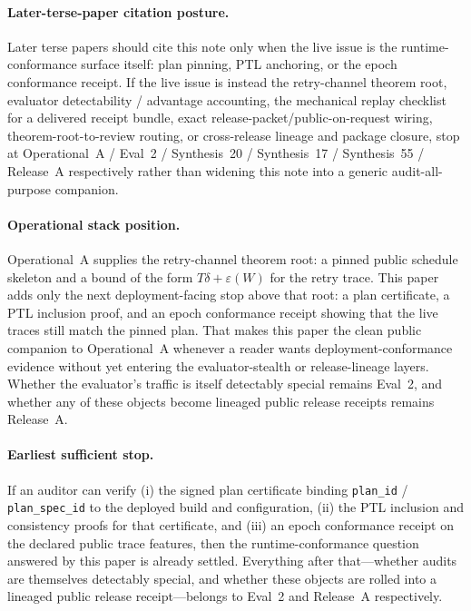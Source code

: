 \documentclass[11pt]{article}
\begin{document}
\paragraph{Later-terse-paper citation posture.}
Later terse papers should cite this note only when the live issue is the runtime-conformance surface itself: plan pinning, PTL anchoring, or the epoch conformance receipt. If the live issue is instead the retry-channel theorem root, evaluator detectability / advantage accounting, the mechanical replay checklist for a delivered receipt bundle, exact release-packet/public-on-request wiring, theorem-root-to-review routing, or cross-release lineage and package closure, stop at Operational~A / Eval~2 / Synthesis~20 / Synthesis~17 / Synthesis~55 / Release~A respectively rather than widening this note into a generic audit-all-purpose companion.\cite{series:operationalA,series:advantagecontracts,series:auditorreplay,series:workedexample,series:seriesspines,series:releaseproperty}

\paragraph{Operational stack position.}
Operational~A supplies the retry-channel theorem root: a pinned public schedule skeleton and a bound of the form $T\delta+\varepsilon(W)$ for the retry trace.
This paper adds only the next deployment-facing stop above that root: a plan certificate, a PTL inclusion proof, and an epoch conformance receipt showing that the live traces still match the pinned plan.
That makes this paper the clean public companion to Operational~A whenever a reader wants deployment-conformance evidence without yet entering the evaluator-stealth or release-lineage layers.
Whether the evaluator's traffic is itself detectably special remains Eval~2, and whether any of these objects become lineaged public release receipts remains Release~A.\cite{series:operationalA,series:advantagecontracts,series:releaseproperty}

\paragraph{Earliest sufficient stop.}
If an auditor can verify (i) the signed plan certificate binding \texttt{plan\_id} / \texttt{plan\_spec\_id} to the deployed build and configuration,
(ii) the PTL inclusion and consistency proofs for that certificate, and (iii) an epoch conformance receipt on the declared public trace features,
then the runtime-conformance question answered by this paper is already settled.
Everything after that---whether audits are themselves detectably special, and whether these objects are rolled into a lineaged public release receipt---belongs to Eval~2 and Release~A respectively.
\end{document}
